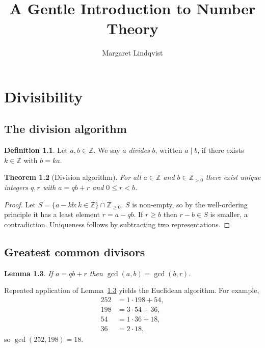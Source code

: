 \documentclass[11pt]{book}
\title{A Gentle Introduction to Number Theory}
\author{Margaret Lindqvist}
\theoremstyle{definition}
\newtheorem{definition}{Definition}[chapter]
\theoremstyle{plain}
\newtheorem{theorem}[definition]{Theorem}
\newtheorem{lemma}[definition]{Lemma}
\theoremstyle{remark}
\begin{document}
\frontmatter
\maketitle
\tableofcontents

\mainmatter
\chapter{Divisibility}

\section{The division algorithm}

\begin{definition}
Let $a,b\in\mathbb{Z}$. We say $a$ \emph{divides} $b$, written $a\mid b$, if there
exists $k\in\mathbb{Z}$ with $b = ka$.
\end{definition}

\begin{theorem}[Division algorithm]\label{thm:div}
For all $a\in\mathbb{Z}$ and $b\in\mathbb{Z}_{>0}$ there exist unique integers $q,r$
with $a = qb + r$ and $0\le r<b$.
\end{theorem}

\begin{proof}
Let $S = \{a - kb : k\in\mathbb{Z}\}\cap\mathbb{Z}_{\ge0}$. $S$ is non-empty, so by
the well-ordering principle it has a least element $r = a - qb$. If $r\ge b$ then
$r-b\in S$ is smaller, a contradiction. Uniqueness follows by subtracting two
representations.
\end{proof}

\section{Greatest common divisors}

\begin{lemma}\label{lem:gcd}
If $a = qb + r$ then $\gcd(a,b) = \gcd(b,r)$.
\end{lemma}

Repeated application of Lemma~\ref{lem:gcd} yields the Euclidean algorithm. For
example,
\begin{align*}
252 &= 1\cdot 198 + 54,\\
198 &= 3\cdot 54 + 36,\\
54  &= 1\cdot 36 + 18,\\
36  &= 2\cdot 18,
\end{align*}
so $\gcd(252,198) = 18$.
\end{document}
